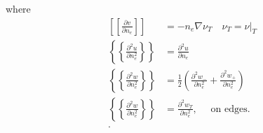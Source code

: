 where
\begin{align*}
\left[\!\!\left[ \frac{\partial v}{\partial n_{e}} \right]\!\!\right] & = - n_{e} \nabla \nu _{T} \quad \nu_{T} = \nu |_{T}
\\
\left\{\!\!\!\left\{ \frac{\partial ^2 u}{\partial n^2_{e}} \right\}\!\!\!\right\}  & = \frac{\partial ^2 u}{\partial
n_{e}} \\
\left\{\!\!\!\left\{ \frac{\partial ^2 w}{\partial n^2_{e}} \right\}\!\!\!\right\}  & = \frac{1}{2} \left( \frac{\partial
^2 w_{-}}{\partial n^2_{e} } + \frac{\partial ^2 w_{+}}{\partial n^2_{e} }   \right) \\
\left\{\!\!\!\left\{ \frac{\partial ^2 w}{\partial n_{e}^2} \right\}\!\!\!\right\} &= \frac{\partial ^2 w_{T}}{\partial
n^2_{e}}, \quad \text{ on edges. }  \\
.\end{align*}







